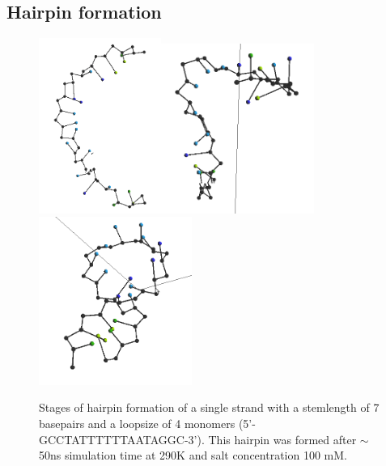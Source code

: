 
\subsection{Hairpin formation}

\begin{figure}[hbt]
\begin{center}
\includegraphics[width=4cm]{images/results_hairpin1}\includegraphics[width=5cm]{images/results_hairpin2}\includegraphics[width=5cm]{images/results_hairpin3}
\end{center}
\caption{Stages of hairpin formation of a single strand with a stemlength of 7 basepairs and a loopsize of 4 monomers (5'-GCCTATTTTTTAATAGGC-3'). This hairpin was formed after $\sim$ 50ns simulation time at 290K and salt concentration 100 mM.}
\label{results_hairpin}
\end{figure}





